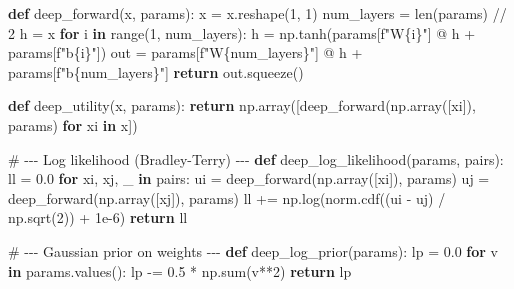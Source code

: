 \documentclass[
  letterpaper,
  numbers=noenddot,
  DIV=11]{scrreprt}
\newenvironment{Shaded}{\begin{snugshade}}{\end{snugshade}}
\newcommand{\BuiltInTok}[1]{\textcolor[rgb]{0.00,0.23,0.31}{#1}}
\newcommand{\CommentTok}[1]{\textcolor[rgb]{0.37,0.37,0.37}{#1}}
\newcommand{\ControlFlowTok}[1]{\textcolor[rgb]{0.00,0.23,0.31}{\textbf{#1}}}
\newcommand{\DecValTok}[1]{\textcolor[rgb]{0.68,0.00,0.00}{#1}}
\newcommand{\FloatTok}[1]{\textcolor[rgb]{0.68,0.00,0.00}{#1}}
\newcommand{\KeywordTok}[1]{\textcolor[rgb]{0.00,0.23,0.31}{\textbf{#1}}}
\newcommand{\NormalTok}[1]{\textcolor[rgb]{0.00,0.23,0.31}{#1}}
\newcommand{\OperatorTok}[1]{\textcolor[rgb]{0.37,0.37,0.37}{#1}}
\newcommand{\SpecialCharTok}[1]{\textcolor[rgb]{0.37,0.37,0.37}{#1}}
\newcommand{\SpecialStringTok}[1]{\textcolor[rgb]{0.13,0.47,0.30}{#1}}
\theoremstyle{plain}
\theoremstyle{definition}
\theoremstyle{remark}
\begin{document}
\begin{Shaded}
\begin{Highlighting}[numbers=left,,]
\KeywordTok{def}\NormalTok{ deep\_forward(x, params):}
\NormalTok{    x }\OperatorTok{=}\NormalTok{ x.reshape(}\DecValTok{1}\NormalTok{, }\DecValTok{1}\NormalTok{)}
\NormalTok{    num\_layers }\OperatorTok{=} \BuiltInTok{len}\NormalTok{(params) }\OperatorTok{//} \DecValTok{2}
\NormalTok{    h }\OperatorTok{=}\NormalTok{ x}
    \ControlFlowTok{for}\NormalTok{ i }\KeywordTok{in} \BuiltInTok{range}\NormalTok{(}\DecValTok{1}\NormalTok{, num\_layers):}
\NormalTok{        h }\OperatorTok{=}\NormalTok{ np.tanh(params[}\SpecialStringTok{f"W}\SpecialCharTok{\{}\NormalTok{i}\SpecialCharTok{\}}\SpecialStringTok{"}\NormalTok{] }\OperatorTok{@}\NormalTok{ h }\OperatorTok{+}\NormalTok{ params[}\SpecialStringTok{f"b}\SpecialCharTok{\{}\NormalTok{i}\SpecialCharTok{\}}\SpecialStringTok{"}\NormalTok{])}
\NormalTok{    out }\OperatorTok{=}\NormalTok{ params[}\SpecialStringTok{f"W}\SpecialCharTok{\{}\NormalTok{num\_layers}\SpecialCharTok{\}}\SpecialStringTok{"}\NormalTok{] }\OperatorTok{@}\NormalTok{ h }\OperatorTok{+}\NormalTok{ params[}\SpecialStringTok{f"b}\SpecialCharTok{\{}\NormalTok{num\_layers}\SpecialCharTok{\}}\SpecialStringTok{"}\NormalTok{]}
    \ControlFlowTok{return}\NormalTok{ out.squeeze()}

\KeywordTok{def}\NormalTok{ deep\_utility(x, params):}
    \ControlFlowTok{return}\NormalTok{ np.array([deep\_forward(np.array([xi]), params) }\ControlFlowTok{for}\NormalTok{ xi }\KeywordTok{in}\NormalTok{ x])}

\CommentTok{\# {-}{-}{-} Log likelihood (Bradley{-}Terry) {-}{-}{-}}
\KeywordTok{def}\NormalTok{ deep\_log\_likelihood(params, pairs):}
\NormalTok{    ll }\OperatorTok{=} \FloatTok{0.0}
    \ControlFlowTok{for}\NormalTok{ xi, xj, \_ }\KeywordTok{in}\NormalTok{ pairs:}
\NormalTok{        ui }\OperatorTok{=}\NormalTok{ deep\_forward(np.array([xi]), params)}
\NormalTok{        uj }\OperatorTok{=}\NormalTok{ deep\_forward(np.array([xj]), params)}
\NormalTok{        ll }\OperatorTok{+=}\NormalTok{ np.log(norm.cdf((ui }\OperatorTok{{-}}\NormalTok{ uj) }\OperatorTok{/}\NormalTok{ np.sqrt(}\DecValTok{2}\NormalTok{)) }\OperatorTok{+} \FloatTok{1e{-}6}\NormalTok{)}
    \ControlFlowTok{return}\NormalTok{ ll}

\CommentTok{\# {-}{-}{-} Gaussian prior on weights {-}{-}{-}}
\KeywordTok{def}\NormalTok{ deep\_log\_prior(params):}
\NormalTok{    lp }\OperatorTok{=} \FloatTok{0.0}
    \ControlFlowTok{for}\NormalTok{ v }\KeywordTok{in}\NormalTok{ params.values():}
\NormalTok{        lp }\OperatorTok{{-}=} \FloatTok{0.5} \OperatorTok{*}\NormalTok{ np.}\BuiltInTok{sum}\NormalTok{(v}\OperatorTok{**}\DecValTok{2}\NormalTok{)}
    \ControlFlowTok{return}\NormalTok{ lp}


\end{Highlighting}
\end{Shaded}
\end{document}
